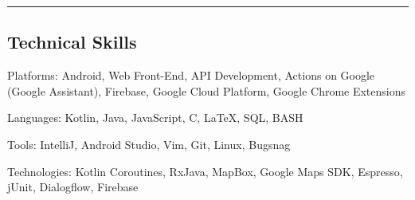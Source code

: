 \documentclass[9pt,letterpaper]{article}
\newenvironment{indentsection}[1]%
{\begin{list}{}%
	{\setlength{\leftmargin}{#1}}%
	\item[]%
}
{\end{list}}
\newcommand{\CPP}
{C\nolinebreak[4]\hspace{-.05em}\raisebox{.22ex}{\footnotesize\bf ++}}
\begin{document}
\hrule
\vspace{-0.4em}
\subsection*{Technical Skills}

\begin{indentsection}{\parindent}
\begin{description*}
	\item[Platforms:]
	Android, Web Front-End, API Development, Actions on Google (Google Assistant), Firebase, Google Cloud Platform, Google Chrome Extensions
	\item[Languages:]
	Kotlin, Java, JavaScript, \CPP, \LaTeX, SQL, BASH
	\item[Tools:]
	IntelliJ, Android Studio, Vim, Git, Linux, Bugsnag
	\item[Technologies:]
	Kotlin Coroutines, RxJava, MapBox, Google Maps SDK, Espresso, jUnit, Dialogflow, Firebase
\end{description*}
\end{indentsection}
\end{document}
